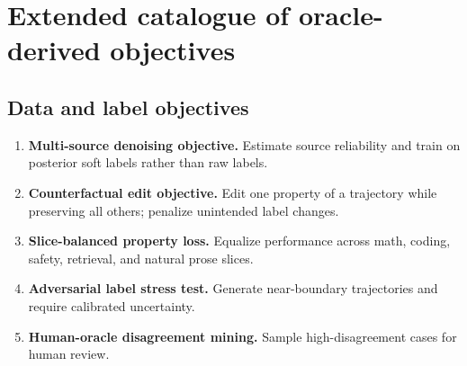 \documentclass[11pt]{article}
\numberwithin{equation}{section}
\begin{document}
\section{Extended catalogue of oracle-derived objectives}
\subsection{Data and label objectives}
\begin{enumerate}[resume]
\item \textbf{Multi-source denoising objective.} Estimate source reliability and train on posterior soft labels rather than raw labels.
\item \textbf{Counterfactual edit objective.} Edit one property of a trajectory while preserving all others; penalize unintended label changes.
\item \textbf{Slice-balanced property loss.} Equalize performance across math, coding, safety, retrieval, and natural prose slices.
\item \textbf{Adversarial label stress test.} Generate near-boundary trajectories and require calibrated uncertainty.
\item \textbf{Human-oracle disagreement mining.} Sample high-disagreement cases for human review.
\end{enumerate}
\end{document}
